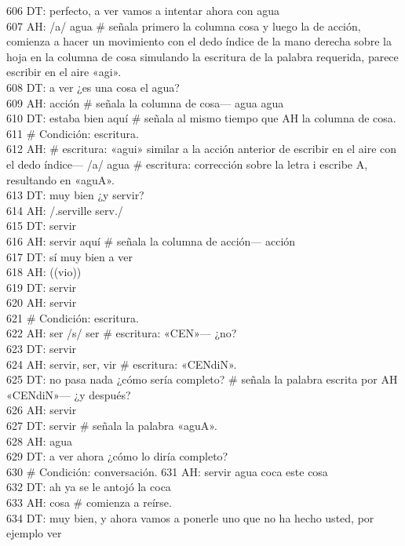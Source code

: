 606 DT: perfecto, a ver vamos a intentar ahora con agua\\
607 AH: /a/ agua \# señala primero la columna cosa y luego la de acción, comienza a hacer un movimiento con el dedo índice de la mano derecha sobre la hoja en la columna de cosa simulando la escritura de la palabra requerida, parece escribir en el aire «agi».\\
608 DT: a ver ¿es una cosa el agua?\\
609 AH: acción \# señala la columna de cosa--- agua agua\\
610 DT: estaba bien aquí \# señala al mismo tiempo que AH la columna de cosa.\\
611 \# Condición: escritura.\\
612 AH: \# escritura: «agui» similar a la acción anterior de escribir en el aire con el dedo índice--- /a/ agua \# escritura: corrección sobre la letra i escribe A, resultando en «aguA».\\
613 DT: muy bien ¿y servir?\\
614 AH: /.serville serv./ \\
615 DT: servir\\
616 AH: servir aquí \# señala la columna de acción--- acción\\
617 DT: sí muy bien a ver\\
618 AH: ((vio))\\
619 DT: servir\\
620 AH: servir\\
621 \# Condición: escritura.\\
622 AH: ser /s/ ser \# escritura: «CEN»--- ¿no?\\
623 DT: servir\\
624 AH: servir, ser, vir \# escritura: «CENdiN».\\
625 DT: no pasa nada ¿cómo sería completo? \# señala la palabra escrita por AH «CENdiN»--- ¿y después?\\
626 AH: servir\\
627 DT: servir \# señala la palabra «aguA».\\
628 AH: agua\\
629 DT: a ver ahora ¿cómo lo diría completo?\\
630 \# Condición: conversación.
631 AH: servir agua coca este cosa\\
632 DT: ah ya se le antojó la coca\\
633 AH: cosa \# comienza a reírse.\\
634 DT: muy bien, y ahora vamos a ponerle uno que no ha hecho usted, por ejemplo ver\\
